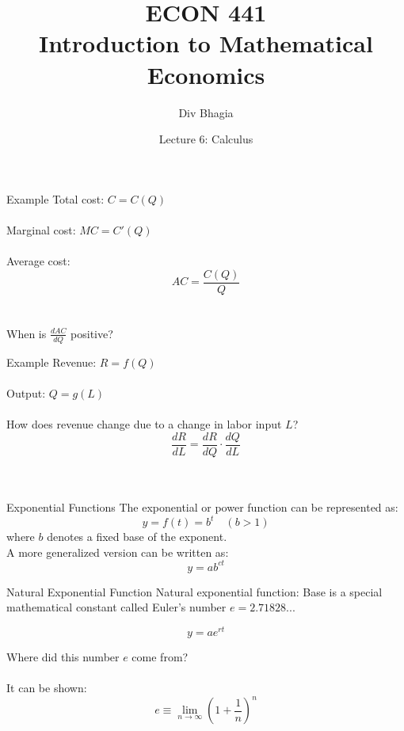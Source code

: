 \documentclass{./../../Latex/teaching_slides}
\begin{document}
\title{ECON 441 \\ \vspace{0.4em} \normalsize Introduction to Mathematical Economics}
\author{Div Bhagia}
\date{Lecture 6: Calculus}

\begin{frame}
\maketitle
\end{frame}


\begin{frame}{Example}
Total cost: $C=C(Q)$ \\~\\
Marginal cost: $MC = C'(Q)$ \\~\\
Average cost:
$$ AC = \frac{C(Q)}{Q} $$ \\~\\
When is $ \frac{d AC}{d Q} $ positive?
\end{frame}


\begin{frame}{Example}
Revenue: $R=f(Q)$ \\~\\
Output: $Q = g(L)$ \\~\\
How does revenue change due to a change in labor input $L$?
$$ \frac{d R}{d L} = \frac{d R}{d Q} \cdot \frac{d Q}{d L} $$ \\~\\
\end{frame}

\begin{frame}{Exponential Functions}
The exponential or power function can be represented as:
$$
y=f(t)=b^{t} \quad(b>1)
$$
where $b$ denotes a fixed base of the exponent. \\
\vspace{1cm}
A more generalized version can be written as:
$$
y=a b^{c t}
$$
\end{frame}

\begin{frame}{Natural Exponential Function}
Natural exponential function: Base is a special mathematical constant called Euler's number $e=2.71828...$

$$
y=a e^{r t}
$$ 
\vspace{1em}

\pause
Where did this number $e$ come from? \\~\\
It can be shown: $$
e \equiv \lim _{n \rightarrow \infty}\left(1+\frac{1}{n}\right)^{n}
$$
\end{frame}
\end{document}

